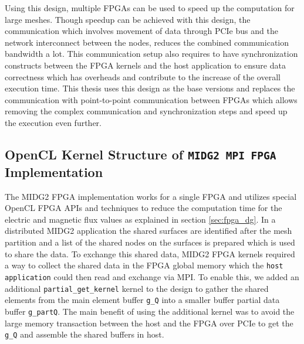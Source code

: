 Using this design, multiple FPGAs can be used to speed up the computation for large meshes.
Though speedup can be achieved with this design, the communication which involves
movement of data through PCIe bus and the network interconnect between the nodes,
reduces the combined communication bandwidth a lot. This communication setup also
requires to have synchronization constructs between the FPGA kernels and the host
application to ensure data correctness which has overheads and contribute to the increase
of the overall execution time. This thesis uses this design as the base versions and replaces
the communication with point-to-point communication between FPGAs which allows
removing the complex communication and synchronization steps and speed up the
execution even further.

\subsection{OpenCL Kernel Structure of \texttt{MIDG2 MPI FPGA} Implementation}
\label{sec:midge_mpi_struc}

The MIDG2 FPGA implementation works for a single FPGA and utilizes special OpenCL FPGA
APIs and techniques to reduce the computation time for the electric and magnetic flux values
as explained in section \ref{sec:fpga_dg}. In a distributed MIDG2 application the shared
surfaces are identified after the mesh partition and a list of the shared nodes on the
surfaces is prepared which is used to share the data.
To exchange this shared data, MIDG2 FPGA kernels required a way to collect the shared
data in the FPGA global memory which the \texttt{host application} could then read and
exchange via MPI. To enable this, we added an additional \texttt{partial\_get\_kernel}
kernel to the design to gather the shared elements from
the main element buffer \texttt{g\_Q} into a smaller buffer partial data buffer \texttt{g\_partQ}.
The main benefit of using the additional kernel was to avoid the large memory transaction between the
host and the FPGA over PCIe to get the \texttt{g\_Q} and assemble the shared buffers in host.

